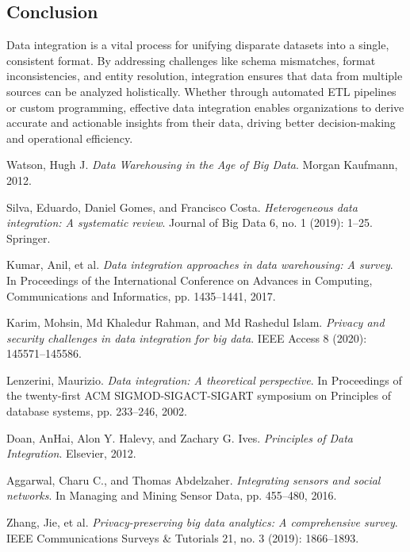 \documentclass[12pt]{article}
\begin{document}
\subsection{Conclusion}

Data integration is a vital process for unifying disparate datasets into a single, consistent format. By addressing challenges like schema mismatches, format inconsistencies, and entity resolution, integration ensures that data from multiple sources can be analyzed holistically. Whether through automated ETL pipelines or custom programming, effective data integration enables organizations to derive accurate and actionable insights from their data, driving better decision-making and operational efficiency.


\newpage
\begin{thebibliography}{10}

Watson, Hugh J. 
\textit{Data Warehousing in the Age of Big Data}. 
Morgan Kaufmann, 2012.

Silva, Eduardo, Daniel Gomes, and Francisco Costa. 
\textit{Heterogeneous data integration: A systematic review}. 
Journal of Big Data 6, no. 1 (2019): 1--25. Springer.

Kumar, Anil, et al. 
\textit{Data integration approaches in data warehousing: A survey}. 
In Proceedings of the International Conference on Advances in Computing, Communications and Informatics, pp. 1435--1441, 2017.

Karim, Mohsin, Md Khaledur Rahman, and Md Rashedul Islam. 
\textit{Privacy and security challenges in data integration for big data}. 
IEEE Access 8 (2020): 145571--145586.

Lenzerini, Maurizio. 
\textit{Data integration: A theoretical perspective}. 
In Proceedings of the twenty-first ACM SIGMOD-SIGACT-SIGART symposium on Principles of database systems, pp. 233--246, 2002.

Doan, AnHai, Alon Y. Halevy, and Zachary G. Ives. 
\textit{Principles of Data Integration}. 
Elsevier, 2012.

Aggarwal, Charu C., and Thomas Abdelzaher.
\textit{Integrating sensors and social networks}.
In Managing and Mining Sensor Data, pp. 455--480, 2016.

Zhang, Jie, et al. 
\textit{Privacy-preserving big data analytics: A comprehensive survey}. 
IEEE Communications Surveys \& Tutorials 21, no. 3 (2019): 1866--1893.

\end{thebibliography}
\end{document}
